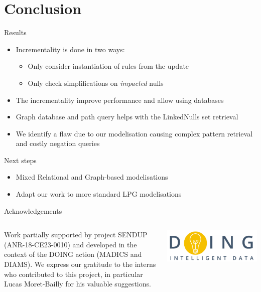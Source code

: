 \section{Conclusion}
\begin{frame}{Results}
    \begin{itemize}
        \item Incrementality is done in two ways:
              \begin{itemize}
                  \item Only consider instantiation of rules from the update
                  \item Only check simplifications on \emph{impacted} nulls
              \end{itemize}\vfill
        \item The incrementality improve performance and allow using databases\vfill
        \item Graph database and path query helps with the LinkedNulls set retrieval\vfill
        \item We identify a flaw due to our modelisation causing complex pattern retrieval and costly negation queries
    \end{itemize}
\end{frame}

\begin{frame}{Next steps}
    \begin{itemize}
        \item Mixed Relational and Graph-based modelisations \cite{hassanGRFusionGraphsFirstClass2018}\vfill
        \item Adapt our work to more standard LPG modelisations
    \end{itemize}
    \vfill
    \begin{block}{Acknowledgements}
        \begin{columns}
            \begin{column}{.7\textwidth}
                \small
                \justifying
                Work partially supported by project SENDUP (ANR-18-CE23-0010) and developed in the context of the DOING action (MADICS and DIAMS).
                We express our gratitude to the interns who contributed to this project, in particular Lucas Moret-Bailly for his valuable suggestions.
            \end{column}
            \begin{column}{.3\textwidth}
                \vfill
                \includegraphics[width=\textwidth]{../logos/logoDOING.png}
                \vfill
            \end{column}
        \end{columns}
    \end{block}
\end{frame}
